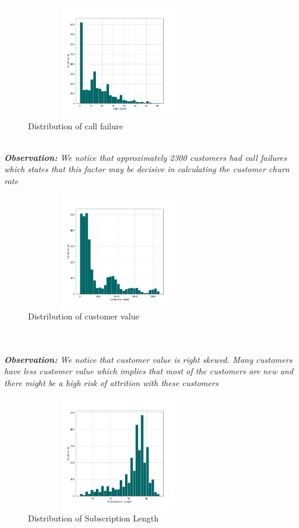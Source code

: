 \documentclass[a4paper, 10pt, conference]{ieeeconf}      %
\begin{document}
\begin{figure}[htp]
    \centering
    \includegraphics[width=8cm,height=5cm]{Images/frequency_distribution_call_failure.png}
    \caption{Distribution of call failure}
    \label{fig: Distribution of call failure}
\end{figure}
 \\\textit{\textbf{Observation:} We notice that approximately 2300 customers had call failures which states that this factor may be decisive in calculating the customer churn rate}
\begin{figure}[htp]
    \centering
    \includegraphics[width=8cm,height=5cm]{Images/frequency_distribution_customer_value.png}
    \caption{Distribution of customer value}
    \label{fig: Distribution of customer value}
\end{figure}
\\\
\\\textit{\textbf{Observation:} We notice that customer value is right skewed. Many customers have less customer value which implies that most of the customers are new and there might be a high risk of attrition with these customers }

\begin{figure}[htp]
    \centering
    \includegraphics[width=8cm,height=5cm]{Images/frequency_distribution_Subscription_Length.png}
    \caption{Distribution of Subscription Length}
    \label{fig: Distribution of Subscription Length}
\end{figure}
\end{document}
